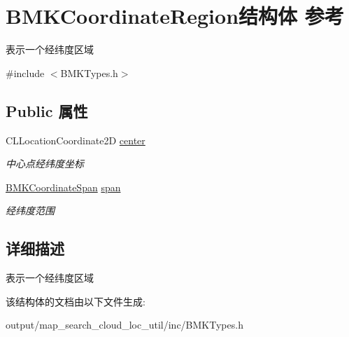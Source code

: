 \hypertarget{struct_b_m_k_coordinate_region}{\section{B\+M\+K\+Coordinate\+Region结构体 参考}
\label{struct_b_m_k_coordinate_region}
}


表示一个经纬度区域  




{\ttfamily \#include $<$B\+M\+K\+Types.\+h$>$}

\subsection*{Public 属性}
\begin{DoxyCompactItemize}
\item 
\hypertarget{struct_b_m_k_coordinate_region_a298c069df033a5690fdebc3c63f86903}{C\+L\+Location\+Coordinate2\+D \hyperlink{struct_b_m_k_coordinate_region_a298c069df033a5690fdebc3c63f86903}{center}}\label{struct_b_m_k_coordinate_region_a298c069df033a5690fdebc3c63f86903}

\begin{DoxyCompactList}\small\item\em 中心点经纬度坐标 \end{DoxyCompactList}\item 
\hypertarget{struct_b_m_k_coordinate_region_a75e65758cbbf7cb3ed6007d4ce301292}{\hyperlink{struct_b_m_k_coordinate_span}{B\+M\+K\+Coordinate\+Span} \hyperlink{struct_b_m_k_coordinate_region_a75e65758cbbf7cb3ed6007d4ce301292}{span}}\label{struct_b_m_k_coordinate_region_a75e65758cbbf7cb3ed6007d4ce301292}

\begin{DoxyCompactList}\small\item\em 经纬度范围 \end{DoxyCompactList}\end{DoxyCompactItemize}


\subsection{详细描述}
表示一个经纬度区域 

该结构体的文档由以下文件生成\+:\begin{DoxyCompactItemize}
\item 
output/map\+\_\+search\+\_\+cloud\+\_\+loc\+\_\+util/inc/B\+M\+K\+Types.\+h\end{DoxyCompactItemize}
